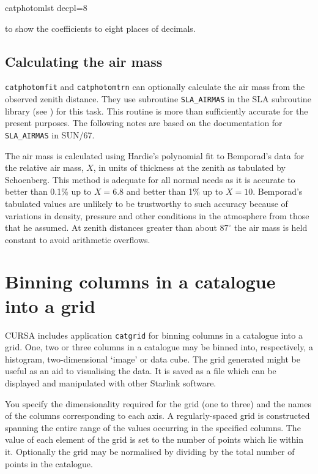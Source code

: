 \documentclass[twoside,11pt]{starlink}
\begin{document}
\begin{terminalv}
catphotomlst  decpl=8
\end{terminalv}

to show the coefficients to eight places of decimals.

\subsection{\label{AIRMASS}Calculating the air mass}

\texttt{catphotomfit} and \texttt{catphotomtrn} can optionally calculate
the air mass from the observed zenith distance.  They use subroutine
\texttt{SLA\_AIRMAS} in the SLA subroutine library (see
\cite{SUN67}) for this task.  This routine is
more than sufficiently accurate for the present purposes.  The
following notes are based on the documentation for \texttt{SLA\_AIRMAS}
in SUN/67.

The air mass is calculated using Hardie's\cite{HARDIE62} polynomial fit
to Bemporad's data for the relative air mass, $X$, in units of thickness
at the zenith as tabulated by Schoenberg\cite{SCHOEN29}.  This method
is adequate for all normal needs as it is accurate to better than 0.1\%
up to $X = 6.8$ and better than 1\% up to $X = 10$.  Bemporad's tabulated
values are unlikely to be trustworthy to such accuracy because of
variations in density, pressure and other conditions in the atmosphere
from those that he assumed.  At zenith distances greater than about
$87^{\circ}$ the air mass is held constant to avoid arithmetic overflows.


\section{\label{GRIDS}Binning columns in a catalogue into a
grid}

CURSA includes application \texttt{catgrid} for binning columns in a
catalogue into a grid.  One, two or three columns in a catalogue may
be binned into, respectively, a histogram, two-dimensional `image' or
data cube.  The grid generated might be useful as an aid to visualising
the data.  It is saved as a file which can be displayed and manipulated
with other Starlink software.

You specify the dimensionality required for the grid (one to three)
and the names of the columns corresponding to each axis.  A
regularly-spaced grid is constructed spanning the entire range of the
values occurring in the specified columns.  The value of each element
of the grid is set to the number of points which lie within it.
Optionally the grid may be normalised by dividing by the total number of
points in the catalogue.
\end{document}
